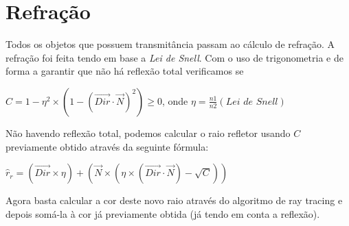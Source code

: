 \documentclass{article}
\begin{document}
    \section*{Refração}
	\par
       	 Todos os objetos que possuem transmitância passam ao cálculo de refração. A refração foi feita tendo em base a \textit{Lei de Snell}. Com o uso de trigonometria e de forma a garantir que não há reflexão total verificamos se \begin{center}$C = 1 - \eta^2 \times (1 - (\overrightarrow{Dir} \cdot \overrightarrow{N})^2) \geq 0$, onde $\eta = \frac{n1}{n2} (\textit{Lei de Snell})$\end{center}
	\par
	Não havendo reflexão total, podemos calcular o raio refletor usando $C$ previamente obtido através da seguinte fórmula: \begin{center}$\hat{r}_r = (\overrightarrow{Dir} \times \eta) + (\overrightarrow{N} \times (\eta \times (\overrightarrow{Dir} \cdot \overrightarrow{N}) - \sqrt{C}))$\end{center}
	\par
	Agora basta calcular a cor deste novo raio através do algoritmo de ray tracing e depois somá-la à cor já previamente obtida (já tendo em conta a reflexão).
\end{document}
